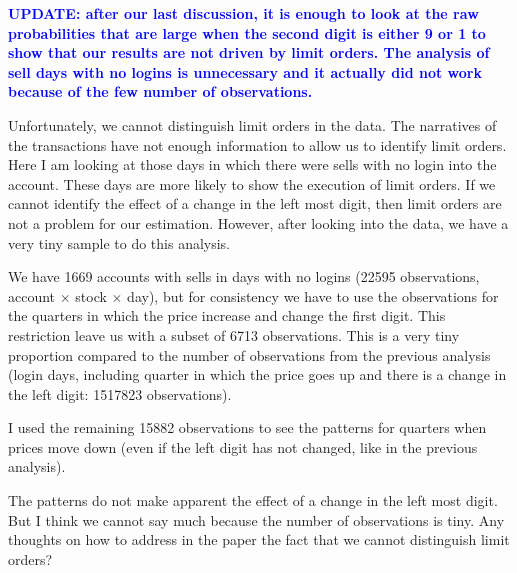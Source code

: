 \textcolor{blue}{\textbf{UPDATE: after our last discussion, it is enough to look at the raw probabilities that are large when the second digit is either 9 or 1 to show that our results are not driven by limit orders. The analysis of sell days with no logins is unnecessary and it actually did not work because of the few number of observations.}}

Unfortunately, we cannot distinguish limit orders in the data. The narratives of the transactions have not enough information to allow us to identify limit orders. Here I am looking at those days in which there were sells with no login into the account. These days are more likely to show the execution of limit orders. If we cannot identify the effect of a change in the left most digit, then limit orders are not a problem for our estimation. 
However, after looking into the data, we have a very tiny sample to do this analysis.

 We have 1669  accounts with sells in days with no logins (22595 observations, account $\times$ stock $\times$ day), but for consistency we have to use the observations for the quarters in which the price increase and change the first digit. This restriction leave us with a subset of 6713 observations.
This is a very tiny proportion compared to the number of observations from the previous analysis (login days, including quarter in which the price goes up and there is a change in the left digit: 1517823 observations).


I used the remaining 15882 observations to see the patterns for quarters when prices move down (even if the left digit has not changed, like in the previous analysis). 

The patterns do not make apparent the effect of a change in the left most digit. But I think we cannot say much because the number of observations is tiny. Any thoughts on how to address in the paper the fact that we cannot distinguish limit orders?


